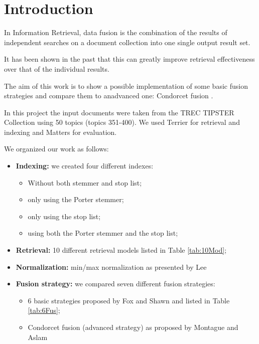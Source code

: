 


    \printTitle
    \newpage
    \tableofcontents
    \newpage

    \section{Introduction}
    
    In Information Retrieval, data fusion is the combination of the results
    of independent searches on a document collection into one single output
    result set.
    
    It has been shown in the past that this can greatly improve retrieval
    effectiveness over that of the individual results.
    
    The aim of this work is to show a possible implementation of some basic
    fusion strategies and compare them to anadvanced one: Condorcet fusion \cite{3}.

    In this project the input documents were taken from the TREC TIPSTER Collection using 50 topics (topics 351-400).
    We used Terrier for retrieval and indexing and Matters for evaluation.
    
    We organized our work as follows:

    \begin{itemize}
        \item \textbf{Indexing:} we created four different indexes:
        \begin{itemize}
        	\item Without both stemmer and stop list;
        	\item only using the Porter stemmer;
        	\item only using the stop list;
        	\item using both the Porter stemmer and the stop list;
        \end{itemize}
        \item \textbf{Retrieval:} 10 different retrieval models listed in Table \ref{tab:10Mod};
		\item \textbf{Normalization:} min/max normalization as presented by Lee \cite{1}
        \item \textbf{Fusion strategy:} we compared seven different fusion strategies:
            \begin{itemize}
                \item 6 basic strategies proposed by Fox and Shawn \cite{2} and listed in Table \ref{tab:6Fus};
                \item Condorcet fusion (advanced strategy) as proposed by Montague and Aslam \cite{3}
            \end{itemize}
    \end{itemize}

